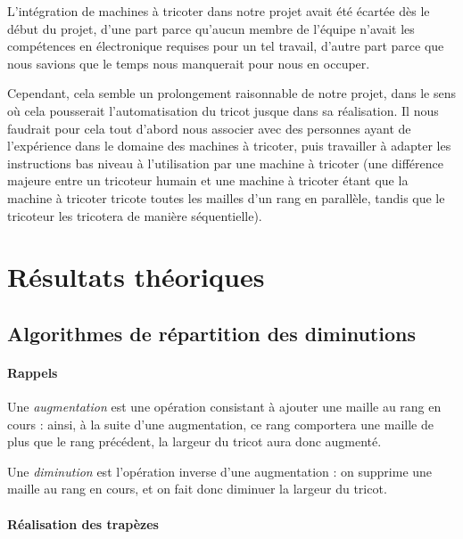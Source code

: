 \documentclass{article}
\begin{document}
L'intégration de machines à tricoter dans notre projet avait été écartée dès le 
début du projet, d'une part parce qu'aucun membre de l'équipe n'avait les compétences 
en électronique requises pour un tel travail, d'autre part parce que nous savions que 
le temps nous manquerait pour nous en occuper.

Cependant, cela semble un prolongement raisonnable de notre projet, dans le sens où 
cela pousserait l'automatisation du tricot jusque dans sa réalisation. Il nous faudrait 
pour cela tout d'abord nous associer avec des personnes ayant de l'expérience dans le 
domaine des machines à tricoter, puis travailler à adapter les instructions bas niveau 
à l'utilisation par une machine à tricoter (une différence majeure entre un tricoteur 
humain et une machine à tricoter étant que la machine à tricoter tricote toutes les 
mailles d'un rang en parallèle, tandis que le tricoteur les tricotera de manière séquentielle).

\section{Résultats théoriques}

\subsection{Algorithmes de répartition des diminutions}

\paragraph{Rappels}

Une \emph{augmentation} est une opération consistant à ajouter une maille au rang en cours : ainsi, à la suite d'une 
augmentation, ce rang comportera une maille de plus que le rang précédent, la largeur du tricot aura donc augmenté.

Une \emph{diminution} est l'opération inverse d'une augmentation : on supprime une maille au rang en cours, et on fait 
donc diminuer la largeur du tricot.


\paragraph{Réalisation des trapèzes}
\end{document}
